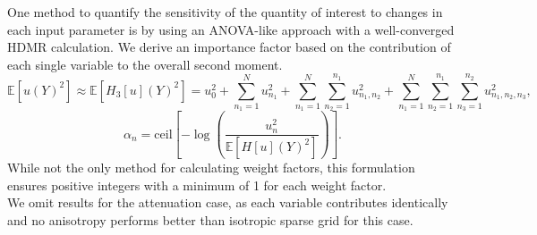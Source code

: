 \documentclass[11pt]{article}
\newcommand{\expv}[1]{\ensuremath{\mathbb{E}[ #1]}}
\begin{document}
One method to quantify the sensitivity of the quantity of interest to changes in each input parameter is by using an ANOVA-like approach with a well-converged HDMR calculation.  We derive an importance factor based on the contribution of each single variable to the overall second moment.
\begin{equation}
\expv{u(Y)^2} \approx \expv{H_3[u](Y)^2} =
                    u_0^2 + \sum_{n_1=1}^N u_{n_1}^2 + \sum_{n_1=1}^N\sum_{n_2=1}^{n_1} u_{n_1,n_2}^2 + 
                     \sum_{n_1=1}^N\sum_{n_2=1}^{n_1}\sum_{n_3=1}^{n_2}u_{n_1,n_2,n_3}^2,
\end{equation}
\begin{equation}
\alpha_n = \text{ceil}\left[-\log\left(\frac{u_n^2}{\expv{H[u](Y)^2}}\right)\right].
\end{equation}
While not the only method for calculating weight factors, this formulation ensures positive integers with a minimum of 1 for each weight factor.\\

We omit results for the attenuation case, as each variable contributes identically and no anisotropy performs better than isotropic sparse grid for this case.
\end{document}
